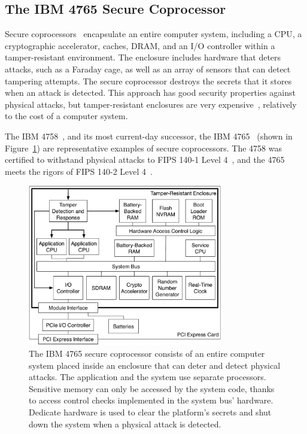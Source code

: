 \subsection{The IBM 4765 Secure Coprocessor}

Secure coprocessors~\cite{yee1994coprocessors} encapsulate an entire computer
system, including a CPU, a cryptographic accelerator, caches, DRAM, and an I/O
controller within a tamper-resistant environment. The enclosure includes
hardware that deters attacks, such as a Faraday cage, as well as an array of
sensors that can detect tampering attempts. The secure coprocessor destroys the
secrets that it stores when an attack is detected. This approach has good
security properties against physical attacks, but tamper-resistant enclosures
are very expensive~\cite{anderson2001security}, relatively to the cost of a
computer system.

The IBM 4758~\cite{smith1999ibm4758}, and its most current-day successor, the
IBM 4765~\cite{nist2015ibm4765} (shown in Figure~\ref{fig:ibm_4765}) are
representative examples of secure coprocessors. The 4758 was certified to
withstand physical attacks to FIPS 140-1 Level 4~\cite{smith1999validating},
and the 4765 meets the rigors of FIPS 140-2 Level 4~\cite{nist2011fipscert}.

\begin{figure}[hbt]
  \centering
  \includegraphics[width=85mm]{figures/ibm_4765.pdf}
  \caption{
    The IBM 4765 secure coprocessor consists of an entire computer system
    placed inside an enclosure that can deter and detect physical attacks.
    The application and the system use separate processors. Sensitive memory
    can only be accessed by the system code, thanks to access control checks
    implemented in the system bus' hardware. Dedicate hardware is used to clear
    the platform's secrets and shut down the system when a physical attack is
    detected.
  }
  \label{fig:ibm_4765}
\end{figure}

